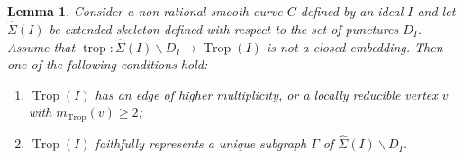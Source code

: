\documentclass[11pt]{amsart}
\numberwithin{equation}{section}
\theoremstyle{plain}
\newtheorem{lemma}[theorem]{Lemma}
\theoremstyle{definition}
\theoremstyle{remark}
\begin{document}
\begin{lemma}\label{lem:nonHomeo} 
  Consider a non-rational smooth curve $C$ defined by an ideal $I$ and
  let $\widehat{\Sigma}(I)$ be extended skeleton defined with respect
  to the set of punctures $D_I$.  Assume that $\operatorname{trop}\colon
  \widehat{\Sigma}(I)\smallsetminus D_I\to \operatorname{Trop}(I)$ is not a closed
  embedding.  Then one of the following conditions hold:
\begin{enumerate}[(1)]
\item $\operatorname{Trop}(I)$ has an edge of higher multiplicity, or a locally reducible vertex $v$ with
  $m_\operatorname{Trop}(v)\geq 2$;
\item $\operatorname{Trop}(I)$ faithfully represents a unique subgraph $\Gamma$ of $\widehat{\Sigma}(I)\smallsetminus D_I$. 
\end{enumerate}
\end{lemma}
\end{document}
